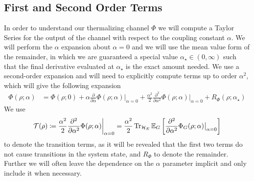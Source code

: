 \subsection{First and Second Order Terms}
In order to understand our thermalizing channel $\Phi$ we will compute a Taylor Series for the output of the channel with respect to the coupling constant $\alpha$. We will perform the $\alpha$ expansion about $\alpha = 0$ and we will use the mean value form of the remainder, in which we are guaranteed a special value $\alpha_{\star} \in (0, \infty)$ such that the final derivative evaluated at $\alpha_{\star}$ is the exact amount needed. We use a second-order expansion and will need to explicitly compute terms up to order $\alpha^2$, which will give the following expansion
\begin{align}
    \Phi(\rho; \alpha) &= \Phi(\rho; 0) + \alpha \frac{\partial}{\partial \alpha} \Phi(\rho; \alpha) \big|_{\alpha = 0} + \frac{\alpha^2}{2} \frac{\partial^2}{\partial \alpha^2} \Phi(\rho; \alpha) \big|_{\alpha = 0} + R_{\Phi}(\rho; \alpha_{\star}) \label{eq:phi_taylor_series}
\end{align}
We use
\begin{equation}
    \mathcal{T}(\rho) \coloneqq \frac{\alpha^2}{2} \frac{\partial^2}{\partial \alpha^2} \Phi(\rho; \alpha) \bigg|_{\alpha = 0} = \frac{\alpha^2}{2}  \operatorname{Tr}_{\mathcal{H}_E} \mathbb{E}_{G} \left[\frac{\partial^2}{\partial \alpha^2} \Phi_G(\rho; \alpha) \big|_{\alpha = 0}\right] \label{eq:transition_def}
\end{equation} to denote the transition terms, as it will be revealed that the first two terms do not cause transitions in the system state, and $R_{\Phi}$ to denote the remainder. 
Further we will often leave the dependence on the  $\alpha$ parameter implicit and only include it when necessary.


